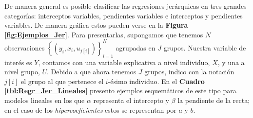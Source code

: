 De manera general es posible clasificar las regresiones jerárquicas en tres grandes categorías: interceptos variables, pendientes variables e interceptos y pendientes variables. De manera gráfica estos pueden verse en la \textbf{Figura \ref{fig:Ejemplos_Jer}}. Para presentarlas, supongamos que tenemos $N$ observaciones $\left\lbrace(y_i,x_i,u_{j[i]})\right\rbrace_{i=1}^{N}$ agrupadas en $J$ grupos. Nuestra variable de interés es $Y$, contamos con una variable explicativa a nivel individuo, $X$,  y una a nivel grupo,  $U$.  Debido a que ahora tenemos $J$ grupos, indico con la notación $j[i]$ el grupo al que pertenece el $i$-ésimo individuo. En el \textbf{Cuadro \ref{tbl:Regr_Jer_Lineales}} presento ejemplos esquemáticos de este tipo para modelos lineales en los que $\alpha$ representa el intercepto y $\beta$ la pendiente de la recta; en el caso de los \textit{hipercoeficientes} estos se representan por $a$ y $b$.\\

